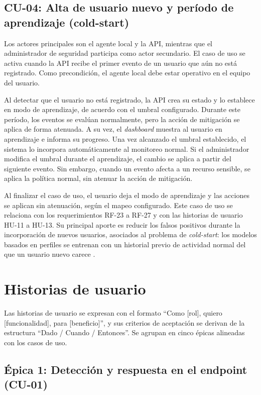 \subsection{CU-04: Alta de usuario nuevo y período de aprendizaje (cold-start)}
\label{sec:cu04}

Los actores principales son el agente local y la API, mientras que el administrador de seguridad participa como actor secundario. El caso de uso se activa cuando la API recibe el primer evento de un usuario que aún no está registrado. Como precondición, el agente local debe estar operativo en el equipo del usuario.

Al detectar que el usuario no está registrado, la API crea su estado y lo establece en modo de aprendizaje, de acuerdo con el umbral configurado. Durante este período, los eventos se evalúan normalmente, pero la acción de mitigación se aplica de forma atenuada. A su vez, el \emph{dashboard} muestra al usuario en aprendizaje e informa su progreso. Una vez alcanzado el umbral establecido, el sistema lo incorpora automáticamente al monitoreo normal. Si el administrador modifica el umbral durante el aprendizaje, el cambio se aplica a partir del siguiente evento. Sin embargo, cuando un evento afecta a un recurso sensible, se aplica la política normal, sin atenuar la acción de mitigación.

Al finalizar el caso de uso, el usuario deja el modo de aprendizaje y las acciones se aplican sin atenuación, según el mapeo configurado. Este caso de uso se relaciona con los requerimientos RF-23 a RF-27 y con las historias de usuario HU-11 a HU-13. Su principal aporte es reducir los falsos positivos durante la incorporación de nuevos usuarios, asociados al problema de \emph{cold-start}: los modelos basados en perfiles se entrenan con un historial previo de actividad normal del que un usuario nuevo carece \parencite{VillarrealVasquez2021}.

\section{Historias de usuario}
\label{sec:historias-usuario}

Las historias de usuario se expresan con el formato ``Como [rol], quiero [funcionalidad], para [beneficio]'', y sus criterios de aceptación se derivan de la estructura ``Dado / Cuando / Entonces''. Se agrupan en cinco épicas alineadas con los casos de uso.

\subsection{Épica 1: Detección y respuesta en el endpoint (CU-01)}

